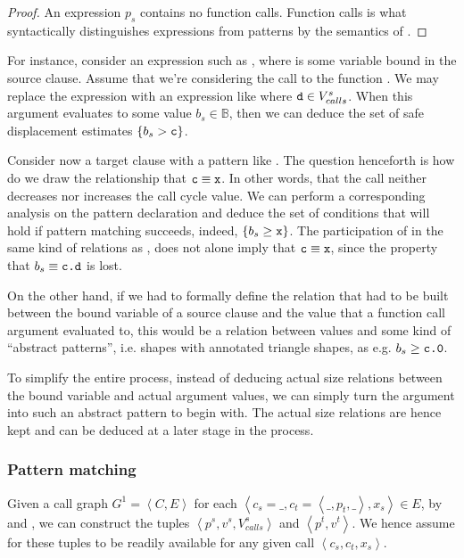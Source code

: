 \begin{proof} An expression $p_s$ contains no function calls. Function calls is
what syntactically distinguishes expressions from patterns by the semantics of
\D{}.\end{proof}

For instance, consider an expression such as , where 
is some variable bound in the source clause. Assume that we're considering the
call to the function . We may replace the expression 
with an expression like  where $\text{{\ttfamily d}}\in V^s_{calls}$. When this
argument evaluates to some value $b_s\in\mathbb{B}$, then we can deduce the set
of safe displacement estimates $\{b_s>\text{{\ttfamily c}}\}$.

Consider now a target clause with a pattern like . The question
henceforth is how do we draw the relationship that $\text{{\ttfamily c}}\equiv\text{{\ttfamily x}}$.
In other words, that the call neither decreases nor increases the call cycle
value. We can perform a corresponding analysis on the pattern declaration and
deduce the set of conditions that will hold if pattern matching succeeds,
indeed, $\{b_s\geq \text{{\ttfamily x}}\}$. The participation of  in the same kind
of relations as , does not alone imply that $\text{{\ttfamily c}}\equiv\text{{\ttfamily x}}$,
since the property that $b_s\equiv\text{{\ttfamily c.d}}$ is lost.

On the other hand, if we had to formally define the relation that had to be
built between the bound variable of a source clause and the value that a
function call argument evaluated to, this would be a relation between values
and some kind of ``abstract patterns'', i.e. shapes with annotated triangle
shapes, as e.g. $b_s\geq\text{{\ttfamily c.0}}$.

To simplify the entire process, instead of deducing actual size relations
between the bound variable and actual argument values, we can simply turn the
argument into such an abstract pattern to begin with. The actual size relations
are hence kept and can be deduced at a later stage in the process.


\subsubsection{Pattern matching}

\begin{definition} Given a call graph $G^1= \left\langle C,E \right\rangle$ for
each $\left\langle c_s=\_, c_t=\left\langle \_,p_t,\_\right\rangle,
x_s\right\rangle \in E$, by  and
, we can construct the tuples $\left\langle
p^s,v^s,V_{calls}^s \right\rangle$ and $\left\langle p^t,v^t \right\rangle$. We
hence assume for these tuples to be readily available for any given call
$\left\langle c_s, c_t, x_s \right\rangle$.\end{definition}

